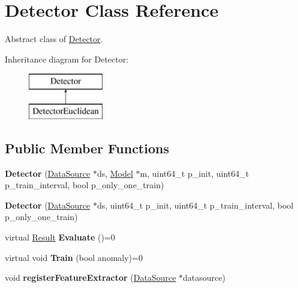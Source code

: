 \hypertarget{classDetector}{}\section{Detector Class Reference}
\label{classDetector}


Abstract class of \hyperlink{classDetector}{Detector}.  


Inheritance diagram for Detector\+:\begin{figure}[H]
\begin{center}
\leavevmode
\includegraphics[height=2.000000cm]{classDetector}
\end{center}
\end{figure}
\subsection*{Public Member Functions}
\begin{DoxyCompactItemize}
\item 
\hypertarget{classDetector_ad1eaa0403bdfc31b523fc7ee837bd2e6}{}{\bfseries Detector} (\hyperlink{classDataSource}{Data\+Source} $\ast$ds, \hyperlink{classModel}{Model} $\ast$m, uint64\+\_\+t p\+\_\+init, uint64\+\_\+t p\+\_\+train\+\_\+interval, bool p\+\_\+only\+\_\+one\+\_\+train)\label{classDetector_ad1eaa0403bdfc31b523fc7ee837bd2e6}

\item 
\hypertarget{classDetector_ab791196650bf084ead62c88d29b6ef53}{}{\bfseries Detector} (\hyperlink{classDataSource}{Data\+Source} $\ast$ds, uint64\+\_\+t p\+\_\+init, uint64\+\_\+t p\+\_\+train\+\_\+interval, bool p\+\_\+only\+\_\+one\+\_\+train)\label{classDetector_ab791196650bf084ead62c88d29b6ef53}

\item 
\hypertarget{classDetector_a0b509e253c05cb27135524c4a7812c30}{}virtual \hyperlink{structResult}{Result} {\bfseries Evaluate} ()=0\label{classDetector_a0b509e253c05cb27135524c4a7812c30}

\item 
\hypertarget{classDetector_a25534c5a1eefeae99b3cfa1cc2c560ca}{}virtual void {\bfseries Train} (bool anomaly)=0\label{classDetector_a25534c5a1eefeae99b3cfa1cc2c560ca}

\item 
\hypertarget{classDetector_aedc62b2e44f9ade929695432abe49279}{}void {\bfseries register\+Feature\+Extractor} (\hyperlink{classDataSource}{Data\+Source} $\ast$datasource)\label{classDetector_aedc62b2e44f9ade929695432abe49279}

\end{DoxyCompactItemize}
